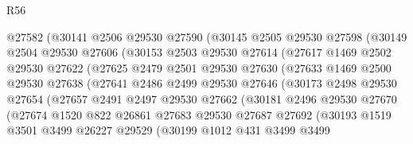 \begin{lexlean}{R56}
\begin{coremodule}
                @27582
                (@30141
                  @2506
                  @29530
                  @27590
                  (@30145
                    @2505
                    @29530
                    @27598
                    (@30149
                      @2504
                      @29530
                      @27606
                      (@30153
                        @2503
                        @29530
                        @27614
                        (@27617
                          @1469
                          @2502
                          @29530
                          @27622
                          (@27625
                            @2479
                            @2501
                            @29530
                            @27630
                            (@27633
                              @1469
                              @2500
                              @29530
                              @27638
                              (@27641
                                @2486
                                @2499
                                @29530
                                @27646
                                (@30173
                                  @2498
                                  @29530
                                  @27654
                                  (@27657
                                    @2491
                                    @2497
                                    @29530
                                    @27662
                                    (@30181
                                      @2496
                                      @29530
                                      @27670
                                      (@27674
                                        @1520
                                        @822
                                        @26861
                                        @27683
                                        @29530
                                        @27687
                                        @27692
                                        (@30193
                                          @1519
                                          @3501
                                          @3499
                                          @26227
                                          @29529
                                          (@30199
                                            @1012
                                            @431
                                            @3499
                                            @3499

\end{coremodule}
\end{lexlean}

